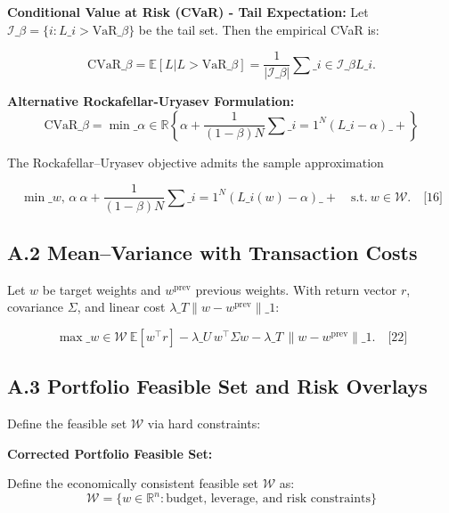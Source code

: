 \documentclass[11pt,a4paper]{article}
\begin{document}
\textbf{Conditional Value at Risk (CVaR) - Tail Expectation:}
Let $\mathcal{I}\_\beta=\{i: L\_i > \mathrm{VaR}\_\beta\}$ be the tail set. Then the empirical CVaR is:

\begin{equation}
\mathrm{CVaR}\_\beta = \mathbb{E}[L | L > \mathrm{VaR}\_\beta] = \frac{1}{|\mathcal{I}\_\beta|}\sum\_{i\in\mathcal{I}\_\beta} L\_i.
\end{equation}

\textbf{Alternative Rockafellar-Uryasev Formulation:}
\begin{equation}
\mathrm{CVaR}\_\beta = \min\_{\alpha \in \mathbb{R}} \left\{ \alpha + \frac{1}{(1-\beta)N}\sum\_{i=1}^N (L\_i-\alpha)\_+ \right\}
\end{equation}

The Rockafellar–Uryasev objective admits the sample approximation

\begin{equation}
\min\_{w,\,\alpha}\ \alpha + \frac{1}{(1-\beta)N}\sum\_{i=1}^N (L\_i(w)-\alpha)\_+\quad\text{s.t.}\ w\in\mathcal{W}.\quad\text{[16]}
\end{equation}

\subsection{A.2 Mean–Variance with Transaction Costs}

Let $w$ be target weights and $w^{\text{prev}}$ previous weights. With return vector $r$, covariance $\Sigma$, and linear cost $\lambda\_T\|w-w^{\text{prev}}\|\_1$:

\begin{equation}
\max\_{w\in\mathcal{W}}\ \mathbb{E}[w^\top r] - \lambda\_U\, w^\top\Sigma w - \lambda\_T\,\|w-w^{\text{prev}}\|\_1.\quad\text{[22]}
\end{equation}

\subsection{A.3 Portfolio Feasible Set and Risk Overlays}

Define the feasible set $\mathcal{W}$ via hard constraints:

\textbf{Corrected Portfolio Feasible Set:}

Define the economically consistent feasible set $\mathcal{W}$ as:
\begin{equation}
\mathcal{W} = \{w \in \mathbb{R}^n : \text{budget, leverage, and risk constraints}\}
\end{equation}
\end{document}
